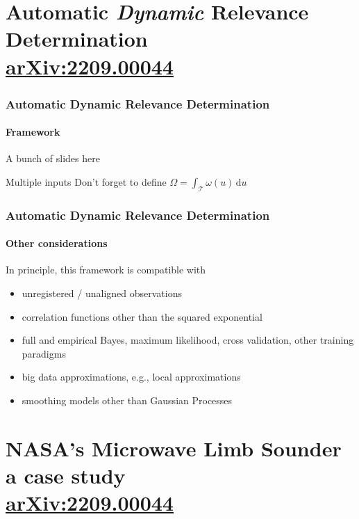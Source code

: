 \documentclass{snedecorbeamer}
\begin{document}
\section{Automatic \textit{Dynamic} Relevance Determination \\
  {\tiny
    \href{https://doi.org/10.48550/arXiv.2209.00044}{arXiv:2209.00044}}
}

\begin{frame}
  \frametitle{Automatic Dynamic Relevance Determination}
  \framesubtitle{Framework}

  A bunch of slides here

  Multiple inputs
  Don't forget to define $\Omega = \int_\mathcal{T}\omega(u)\,\mathrm{d}u$
\end{frame}

\begin{frame}
  \frametitle{Automatic Dynamic Relevance Determination}
  \framesubtitle{Other considerations}

  In principle, this framework is compatible with
  \begin{itemize}
  \item unregistered / unaligned observations
  \item correlation functions other than the squared exponential
  \item full and empirical Bayes, maximum likelihood, cross validation,
    other training paradigms
  \item big data approximations, e.g., local approximations
  \item smoothing models other than Gaussian Processes
  \end{itemize}
\end{frame}

\section{NASA's Microwave Limb Sounder \\ {\small a case study} \\
  {\tiny
    \href{https://doi.org/10.48550/arXiv.2209.00044}{arXiv:2209.00044}}}
\end{document}
